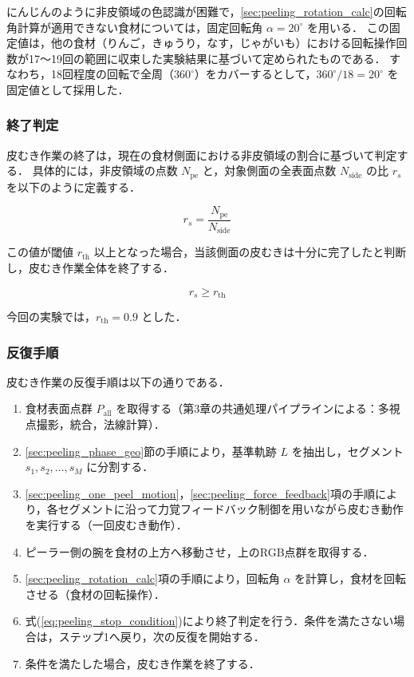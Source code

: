 にんじんのように非皮領域の色認識が困難で，\ref{sec:peeling_rotation_calc}の回転角計算が適用できない食材については，固定回転角 $\alpha = 20^\circ$ を用いる．
この固定値は，他の食材（りんご，きゅうり，なす，じゃがいも）における回転操作回数が17〜19回の範囲に収束した実験結果に基づいて定められたものである．
すなわち，18回程度の回転で全周（$360^\circ$）をカバーするとして，$360^\circ / 18 = 20^\circ$ を固定値として採用した．

\subsubsection{終了判定}

皮むき作業の終了は，現在の食材側面における非皮領域の割合に基づいて判定する．
具体的には，非皮領域の点数 $N_{\mathrm{pe}}$ と，対象側面の全表面点数 $N_{\mathrm{side}}$ の比 $r_s$ を以下のように定義する．

\begin{equation}
  r_s = \frac{N_{\mathrm{pe}}}{N_{\mathrm{side}}}
  \label{eq:peeling_stop_ratio}
\end{equation}

この値が閾値 $r_{\mathrm{th}}$ 以上となった場合，当該側面の皮むきは十分に完了したと判断し，皮むき作業全体を終了する．

\begin{equation}
  r_s \ge r_{\mathrm{th}}
  \label{eq:peeling_stop_condition}
\end{equation}

今回の実験では，$r_{\mathrm{th}} = 0.9$ とした．

\subsubsection{反復手順}

皮むき作業の反復手順は以下の通りである．

\begin{enumerate}
  \item 食材表面点群 $P_{\mathrm{all}}$ を取得する（第3章の共通処理パイプラインによる：多視点撮影，統合，法線計算）．
  \item \ref{sec:peeling_phase_geo}節の手順により，基準軌跡 $L$ を抽出し，セグメント $s_1, s_2, \ldots, s_M$ に分割する．
  \item \ref{sec:peeling_one_peel_motion}，\ref{sec:peeling_force_feedback}項の手順により，各セグメントに沿って力覚フィードバック制御を用いながら皮むき動作を実行する（一回皮むき動作）．
  \item ピーラー側の腕を食材の上方へ移動させ，上のRGB点群を取得する．
  \item \ref{sec:peeling_rotation_calc}項の手順により，回転角 $\alpha$ を計算し，食材を回転させる（食材の回転操作）．
  \item 式(\ref{eq:peeling_stop_condition})により終了判定を行う．条件を満たさない場合は，ステップ1へ戻り，次の反復を開始する．
  \item 条件を満たした場合，皮むき作業を終了する．
\end{enumerate}

